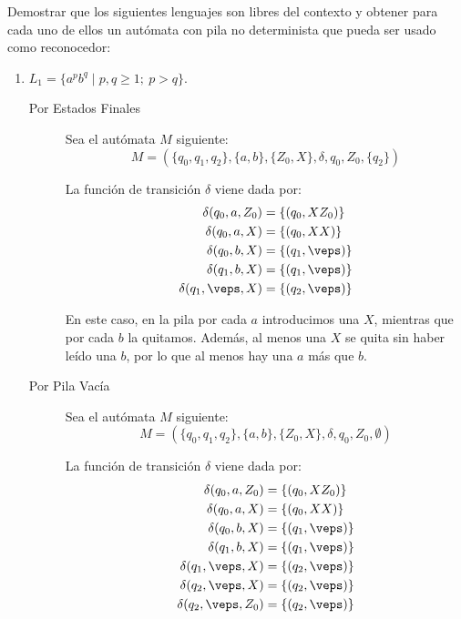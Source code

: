 \begin{ejercicio}\label{ej:1.5.4}
    Demostrar que los siguientes lenguajes son libres del contexto y obtener para cada uno de ellos un autómata con pila no determinista que pueda ser usado como reconocedor:
    \begin{enumerate}
        \item $L_1 = \{a^pb^q \mid p,q\geq 1;\ p>q\}$.
        \begin{description}
            \item[Por Estados Finales] Sea el autómata $M$ siguiente:
            $$M = (\{q_0,q_1,q_2\},\{a,b\},\{Z_0,X\},\delta,q_0,Z_0,\{q_2\})$$
            
            La función de transición $\delta$ viene dada por:
            \begin{align*}
                \delta(q_0,a,Z_0) &= \{(q_0,XZ_0)\} \\
                \delta(q_0,a,X) &= \{(q_0,XX)\} \\
                \delta(q_0,b,X) &= \{(q_1,\veps)\} \\
                \delta(q_1,b,X) &= \{(q_1,\veps)\} \\
                \delta(q_1,\veps,X) &= \{(q_2,\veps)\}
            \end{align*}

            En este caso, en la pila por cada $a$ introducimos una $X$, mientras que por cada $b$ la quitamos. Además, al menos una $X$ se quita sin haber leído una $b$, por lo que al menos hay una $a$ más que $b$.

            \item[Por Pila Vacía] Sea el autómata $M$ siguiente:
            $$M = (\{q_0,q_1,q_2\},\{a,b\},\{Z_0,X\},\delta,q_0,Z_0,\emptyset)$$
            
            La función de transición $\delta$ viene dada por:
            \begin{align*}
                \delta(q_0,a,Z_0) &= \{(q_0,XZ_0)\} \\
                \delta(q_0,a,X) &= \{(q_0,XX)\} \\
                \delta(q_0,b,X) &= \{(q_1,\veps)\} \\
                \delta(q_1,b,X) &= \{(q_1,\veps)\} \\
                \delta(q_1,\veps,X) &= \{(q_2,\veps)\} \\
                \delta(q_2,\veps,X) &= \{(q_2,\veps)\} \\
                \delta(q_2,\veps,Z_0) &= \{(q_2,\veps)\}
            \end{align*}


\end{description}
\end{enumerate}
\end{ejercicio}
